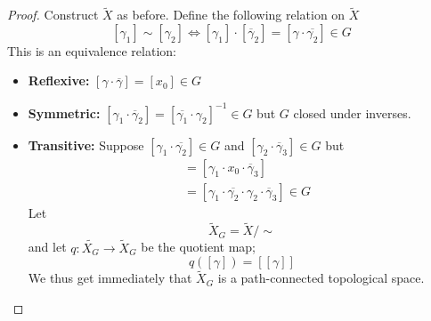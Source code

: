 \documentclass[11pt,a4paper]{article}
\theoremstyle{definition}
\theoremstyle{plain}
\theoremstyle{remark}
\newcommand{\1}{\mathbbm{1}}
\begin{document}
\begin{proof}
    Construct $\tilde{X}$ as before. Define the following relation on $\tilde{X}$ 
    $$[\gamma_1] \sim [\gamma_2] \iff [\gamma_1] \cdot [\overline{\gamma}_2] = [\gamma \cdot \overline{\gamma_2}] \in G$$
    This is an equivalence relation: 
    \begin{itemize}
        \item \textbf{Reflexive:} $[\gamma \cdot \overline{\gamma}] = [x_0] \in G$
        \item \textbf{Symmetric:} $[\gamma_1 \cdot \overline{\gamma}_2] = [\overline{\gamma_1} \cdot \gamma_2]^{-1} \in G$
        but $G$ closed under inverses. 
        \item \textbf{Transitive:} Suppose $[\gamma_1 \cdot \overline{\gamma_2}] \in G$ and $[\gamma_2 \cdot \overline{\gamma}_3] \in G$ 
        but 
        \begin{align*}
            [\gamma_1 \cdot \gamma_3] &= [\gamma_1 \cdot x_0 \cdot \overline{\gamma}_3] \\
            &= [\gamma_1 \cdot \overline{\gamma_2} \cdot \gamma_2 \cdot \overline{\gamma}_3] \in G
        \end{align*}  
        Let 
        $$\tilde{X}_G = \tilde{X} / \sim$$
        and let $q \colon \tilde{X_G} \to \tilde{X}_G$ be the quotient map; 
        $$q([\gamma]) = [[\gamma]]$$
        We thus get immediately that $\tilde{X}_G$ is a path-connected topological space.
    \end{itemize}


\end{proof}
\end{document}
